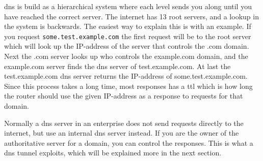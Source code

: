 \Gls{dns} is build as a hierarchical system where each level sends you along until you have reached the correct server. The internet has 13 root servers, and a lookup in the system is backwards. The easiest way to explain this is with an example. If you request \texttt{some.test.example.com} the first request will be to the root server which will look up the IP-address of the server that controls the .com domain. Next the .com server looks up who controls the example.com domain, and the example.com server finds the \Gls{dns} server of test.example.com. At last the test.example.com \Gls{dns} server returns the IP-address of some.test.example.com. Since this process takes a long time, most responses has a \Gls{ttl} which is how long the router should use the given IP-address as a response to requests for that domain.

Normally a \Gls{dns} server in an enterprise does not send requests directly to the internet, but use an internal \Gls{dns} server instead. If you are the owner of the authoritative server for a domain, you can control the responses. This is what a \Gls{dns} tunnel exploits, which will be explained more in the next section. 





 